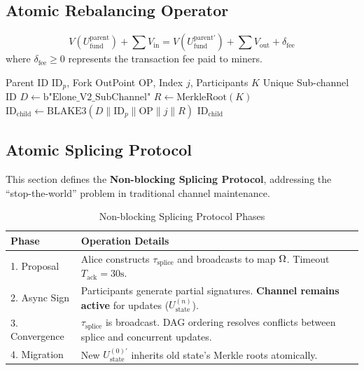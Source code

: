 \subsection{Atomic Rebalancing Operator}

\begin{invariant}
\label{inv:conservation}
$$ V(U_{\mathrm{fund}}^{\mathrm{parent}}) + \sum V_{\mathrm{in}} = V(U_{\mathrm{fund}}^{\mathrm{parent}'}) + \sum V_{\mathrm{out}} + \delta_{\mathrm{fee}} $$
where $\delta_{\mathrm{fee}} \geq 0$ represents the transaction fee paid to miners.
\end{invariant}

\begin{algorithm}[t]
\caption{Deterministic Sub-channel ID Derivation}
\label{alg:id_derivation}
\begin{algorithmic}[1]
\Require Parent ID $\mathrm{ID}_p$, Fork OutPoint $\mathrm{OP}$, Index $j$, Participants $K$
\Ensure Unique Sub-channel ID
\State $D \gets \text{b"Elone\_V2\_SubChannel"}$ 
\State $R \gets \text{MerkleRoot}(K)$
\State $\mathrm{ID}_{\mathrm{child}} \gets \text{BLAKE3}(D \parallel \mathrm{ID}_p \parallel \mathrm{OP} \parallel j \parallel R)$
\State \Return $\mathrm{ID}_{\mathrm{child}}$
\end{algorithmic}
\end{algorithm}

\subsection{Atomic Splicing Protocol}

This section defines the \textbf{Non-blocking Splicing Protocol}, addressing the ``stop-the-world'' problem in traditional channel maintenance.

\begin{table}[htbp]
\centering
\caption{Non-blocking Splicing Protocol Phases}
\label{tab:protocol}
\small
\begin{tabular}{@{}lp{6cm}@{}}
\toprule
\textbf{Phase} & \textbf{Operation Details} \\
\midrule
1. Proposal & Alice constructs $\tau_{\mathrm{splice}}$ and broadcasts to map $\Omega$. Timeout $T_{\mathrm{ack}} = 30\text{s}$. \\
2. Async Sign & Participants generate partial signatures. \textbf{Channel remains active} for updates ($U_{\mathrm{state}}^{(n)}$). \\
3. Convergence & $\tau_{\mathrm{splice}}$ is broadcast. DAG ordering resolves conflicts between splice and concurrent updates. \\
4. Migration & New $U_{\mathrm{state}}^{(0)'}$ inherits old state's Merkle roots atomically. \\
\bottomrule
\end{tabular}
\end{table}

